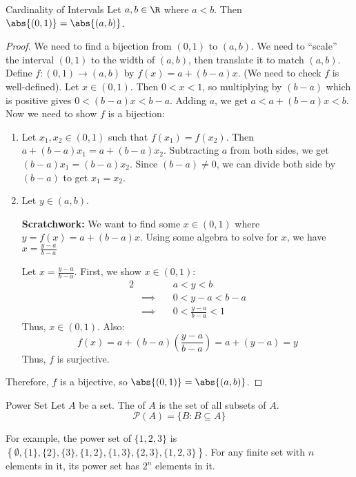 \begin{exbox}{Cardinality of Intervals}{}
    Let $a,b \in \R$ where $a < b$. Then $\abs{(0,1)} = \abs{(a,b)}$.
    \tcblower
    \begin{proof}
        We need to find a bijection from $(0,1)$ to $(a,b)$. We need to ``scale'' the interval $(0,1)$ to the width of $(a,b)$, then translate it to match $(a,b)$. Define $f : (0,1) \to (a,b)$ by $f(x) = a + (b-a)x$. (We need to check $f$ is well-defined). Let $x \in (0,1)$. Then $0<x<1$, so multiplying by $(b-a)$ which is positive gives $0 < (b-a)x < b-a$. Adding $a$, we get $a < a+(b-a)x < b$. Now we need to show $f$ is a bijection:
        \begin{enumerate}
            \item Let $x_1, x_2 \in (0,1)$ such that $f(x_1) = f(x_2)$. Then $a + (b-a)x_1 = a+ (b-a)x_2$. Subtracting $a$ from both sides, we get $(b-a)x_1 = (b-a)x_2$. Since $(b-a) \neq 0$, we can divide both side by $(b-a)$ to get $x_1 = x_2$.
            \item Let $y \in (a,b)$.
            \begin{notebox}
                \textbf{Scratchwork:} We want to find some $x \in (0,1)$ where $y = f(x) = a + (b-a)x$. Using some algebra to solve for $x$, we have $x = \frac{y-a}{b-a}$
            \end{notebox}
            Let $x = \frac{y-a}{b-a}$. First, we show $x \in (0,1)$:
            \begin{alignat*}{2}
                && a < y < b \\
                & \implies \quad & 0 < y-a < b-a \\
                & \implies & 0 < \frac{y-a}{b-a} < 1
            \end{alignat*}
            Thus, $x \in (0,1)$. Also:
            \[ f(x) = a + (b-a) \left( \frac{y-a}{b-a} \right) = a + (y-a) = y \]
            Thus, $f$ is surjective.
        \end{enumerate}
        Therefore, $f$ is a bijective, so $\abs{(0,1)} = \abs{(a,b)}$.
    \end{proof}
\end{exbox}

\begin{dfnbox}{Power Set}{}
    Let $A$ be a set. The  of $A$ is the set of all subsets of $A$.
    \tcblower
    \[ \mathcal{P}(A) = \{ B : B \subseteq A \} \]
\end{dfnbox}

For example, the power set of $\{1,2,3\}$ is $\left\{\emptyset, \{1\}, \{2\}, \{3\}, \{1,2\}, \{1,3\}, \{2,3\}, \{1,2,3\} \right\}$. For any finite set with $n$ elements in it, its power set has $2^n$ elements in it.


